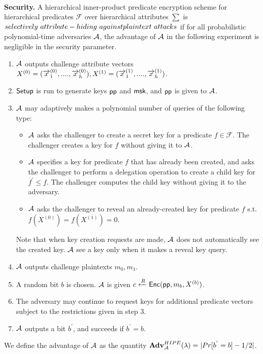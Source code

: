 \documentclass{llncs}
\begin{document}
\begin{appendix}
\\
\textbf{Security.} A hierarchical inner-product predicate encryption scheme for hierarchical predicates $\mathcal{F}$ over hierarchical attributes $\sum$ is $selectively~ attribute-hiding~against \\ plaintext~attacks$ if for all probabilistic polynomial-time adversaries $\mathcal{A}$, the advantage of $\mathcal{A}$ in the following experiment is negligible in the security parameter.
\begin{enumerate}
\item $\mathcal{A}$ outputs challenge attribute vectors $X^{(0)}=(\overrightarrow{x}^{(0)}_{1},....,\overrightarrow{x}^{(0)}_{h}), X^{(1)}=(\overrightarrow{x}^{(1)}_{1},....,\\ \overrightarrow{x}^{(1)}_{h})$.
\item $\mathsf{Setup}$ is run to generate keys $\mathsf{pp}$ and $\mathsf{msk}$, and $\mathsf{pp}$ is given to $\mathcal{A}$.
\item $\mathcal{A}$ may adaptively makes a polynomial number of queries of the following type:
 \begin{itemize}
 \item $\mathcal{A}$ asks the challenger to create a secret key for a predicate $f \in \mathcal{F}$. The challenger creates a key for $f$ without giving it to $\mathcal{A}$.
 \item $\mathcal{A}$ specifies a key for predicate $f$ that has already been created, and asks the challenger to perform a delegation operation to create a child key for $f^{'} \leq f$. The challenger computes the child key without giving it to the adversary.
 \item $\mathcal{A}$ asks the challenger to reveal an already-created key for predicate $f$ s.t. $f(X^{(0)})=f(X^{(1)})=0$.
 \end{itemize}
 Note that when key creation requests are made, $\mathcal{A}$ does not automatically see the created key. $\mathcal{A}$ see a key only when it makes a reveal key query.
\item $\mathcal{A}$ outputs challenge plaintexts $m_{0},m_{1}$.
\item A random bit $b$ is chosen. $\mathcal{A}$ is given $c\xleftarrow{R} \mathsf{Enc}(\mathsf{pp}, m_{b}, X^{(b)})$.
\item The adversary may continue to request keys for additional predicate vectors subject to the restrictions given in step 3.
\item $\mathcal{A}$ outputs a bit $b^{'}$, and succeeds if $b^{'}=b$.
\end{enumerate}
We define the advantage of $\mathcal{A}$ as the quantity $\mathbf{Adv}^{HIPE}_{\mathcal{A}}(\lambda)=|Pr[b^{'}=b]-1/2|$.

\end{appendix}
\end{document}
